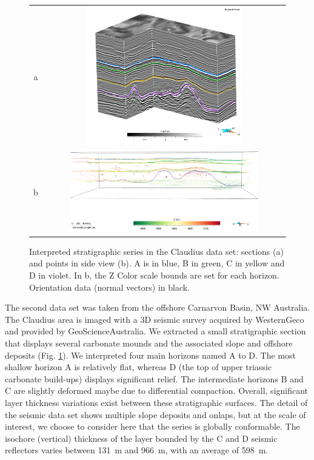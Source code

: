\documentclass[final]{ring20}
\begin{document}
\begin{figure}

\centering\begin{tabular}{cc}
a & \includegraphics[width=0.7\textwidth,height=6cm]{Claudius}\\
b & \includegraphics[width=0.8\textwidth]{Claudius1} \\
\end{tabular}
\caption{Interpreted stratigraphic series in the Claudius data set: sections (a) and points in side view (b). A is in blue, B in green, C in yellow and D in violet. In b, the Z Color scale bounds are set for each horizon. Orientation data (normal vectors) in black.}
\label{fig:ClaudiusData}
\end{figure}


The second data set was taken from the offshore Carnarvon Basin, NW Australia. The Claudius area is imaged with a 3D seismic survey acquired by WesternGeco and provided by GeoScienceAustralia. We extracted a small stratigraphic section that displays several carbonate mounds and the associated slope and offshore deposits (Fig. \ref{fig:ClaudiusData}). We interpreted four main horizons named A to D. The most shallow horizon A is relatively flat, whereas D (the top of upper triassic carbonate build-ups) displays significant relief. The intermediate horizons B and C are slightly deformed maybe due to differential compaction. Overall, significant layer thickness variations exist between these stratigraphic surfaces. The detail of the seismic data set shows multiple slope deposits and onlaps, but at the scale of interest, we choose to consider here that the series is globally conformable. The isochore (vertical) thickness of the layer bounded by the C and D seismic reflectors varies between 131~m and 966~m, with an average of 598~m. 
\end{document}
